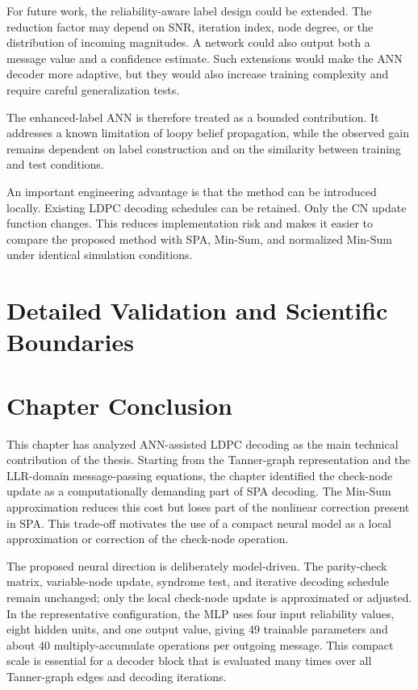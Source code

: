 For future work, the reliability-aware label design could be extended. The reduction factor may depend on SNR, iteration index, node degree, or the distribution of incoming magnitudes. A network could also output both a message value and a confidence estimate. Such extensions would make the ANN decoder more adaptive, but they would also increase training complexity and require careful generalization tests.

The enhanced-label ANN is therefore treated as a bounded contribution. It addresses a known limitation of loopy belief propagation, while the observed gain remains dependent on label construction and on the similarity between training and test conditions.

An important engineering advantage is that the method can be introduced locally. Existing LDPC decoding schedules can be retained. Only the CN update function changes. This reduces implementation risk and makes it easier to compare the proposed method with SPA, Min-Sum, and normalized Min-Sum under identical simulation conditions.

\section{Detailed Validation and Scientific Boundaries}



\section{Chapter Conclusion}
This chapter has analyzed ANN-assisted LDPC decoding as the main technical contribution of the thesis. Starting from the Tanner-graph representation and the LLR-domain message-passing equations, the chapter identified the check-node update as a computationally demanding part of SPA decoding. The Min-Sum approximation reduces this cost but loses part of the nonlinear correction present in SPA. This trade-off motivates the use of a compact neural model as a local approximation or correction of the check-node operation.

The proposed neural direction is deliberately model-driven. The parity-check matrix, variable-node update, syndrome test, and iterative decoding schedule remain unchanged; only the local check-node update is approximated or adjusted. In the representative configuration, the MLP uses four input reliability values, eight hidden units, and one output value, giving 49 trainable parameters and about 40 multiply-accumulate operations per outgoing message. This compact scale is essential for a decoder block that is evaluated many times over all Tanner-graph edges and decoding iterations.

